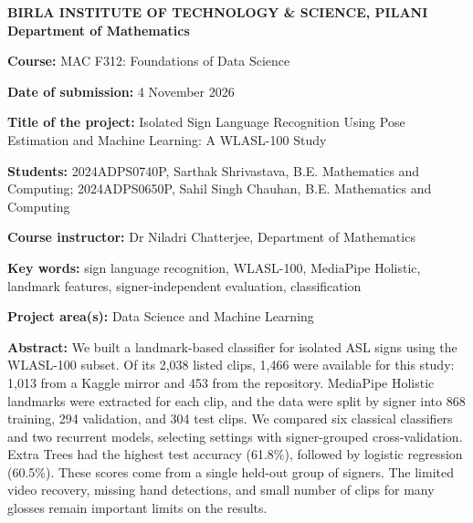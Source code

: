 \documentclass[12pt,a4paper,oneside]{report}
\newcommand{\course}{MAC F312: Foundations of Data Science}
\newcommand{\projecttitle}{Isolated Sign Language Recognition Using Pose Estimation and Machine Learning: A WLASL-100 Study}
\newcommand{\studentone}{Sarthak Shrivastava}
\newcommand{\studenttwo}{Sahil Singh Chauhan}
\newcommand{\submissiondate}{4 November 2026}
\newcommand{\studentoneid}{2024ADPS0740P}
\newcommand{\studenttwoid}{2024ADPS0650P}
\newcommand{\discipline}{B.E. Mathematics and Computing}
\newcommand{\instructor}{Dr Niladri Chatterjee}
\begin{document}
\thispagestyle{empty}
\begin{center}
{\bfseries BIRLA INSTITUTE OF TECHNOLOGY \& SCIENCE, PILANI}\\
{\bfseries Department of Mathematics}
\end{center}
\vspace{0.3em}
\setlength{\parskip}{0.45em}
\noindent\textbf{Course:} \course\par\vspace{0.25em}
\noindent\textbf{Date of submission:} \submissiondate\par\vspace{0.25em}
\noindent\textbf{Title of the project:} \projecttitle\par\vspace{0.25em}
\noindent\textbf{Students:} \studentoneid, \studentone, \discipline; \studenttwoid, \studenttwo, \discipline\par\vspace{0.25em}
\noindent\textbf{Course instructor:} \instructor, Department of Mathematics\par\vspace{0.25em}
\noindent\textbf{Key words:} sign language recognition, WLASL-100, MediaPipe Holistic, landmark features, signer-independent evaluation, classification\par\vspace{0.25em}
\noindent\textbf{Project area(s):} Data Science and Machine Learning\par\vspace{0.45em}
\noindent\textbf{Abstract:} We built a landmark-based classifier for isolated ASL signs using the WLASL-100 subset. Of its 2,038 listed clips, 1,466 were available for this study: 1,013 from a Kaggle mirror and 453 from the repository. MediaPipe Holistic landmarks were extracted for each clip, and the data were split by signer into 868 training, 294 validation, and 304 test clips. We compared six classical classifiers and two recurrent models, selecting settings with signer-grouped cross-validation. Extra Trees had the highest test accuracy (61.8\%), followed by logistic regression (60.5\%). These scores come from a single held-out group of signers. The limited video recovery, missing hand detections, and small number of clips for many glosses remain important limits on the results.

\setlength{\parskip}{0.55em}

\clearpage
{}
\setcounter{page}{3}
\end{document}
